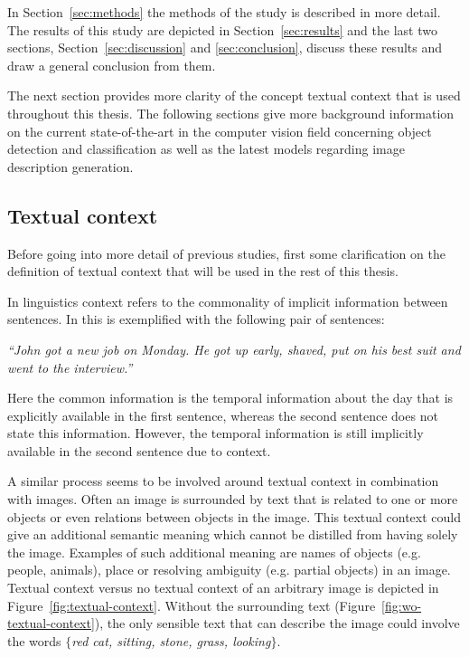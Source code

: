 In Section~\ref{sec:methods} the methods of the study is described in more detail. The results of this study are depicted in Section~\ref{sec:results} and the last two sections, Section~\ref{sec:discussion} and \ref{sec:conclusion}, discuss these results and draw a general conclusion from them.

The next section provides more clarity of the concept textual context that is used throughout this thesis. The following sections give more background information on the current state-of-the-art in the computer vision field concerning object detection and classification as well as the latest models regarding image description generation.


\subsection{Textual context}
Before going into more detail of previous studies, first some clarification on the definition of textual context that will be used in the rest of this thesis.

In linguistics context refers to the commonality of implicit information between sentences. In \cite{Fortu2005} this is exemplified with the following pair of sentences:

\begin{displayquote}
	\emph{``John got a new job on Monday. He got up early, shaved, put on his best suit and went to the interview.''}
\end{displayquote}

\noindent Here the common information is the temporal information about the day that is explicitly available in the first sentence,  whereas the second sentence does not state this information. However, the temporal information is still implicitly available in the second sentence due to context. 

A similar process seems to be involved around textual context in combination with images. Often an image is surrounded by text that is related to one or more objects or even relations between objects in the image. This textual context could give an additional semantic meaning which cannot be distilled from having solely the image. Examples of such additional meaning are names of objects (e.g. people, animals), place or resolving ambiguity (e.g. partial objects) in an image. Textual context versus no textual context of an arbitrary image is depicted in Figure~\ref{fig:textual-context}. Without the surrounding text (Figure~\ref{fig:wo-textual-context}), the only sensible text that can describe the image could involve the words \emph{$\{$red cat, sitting, stone, grass, looking$\}$}. 

